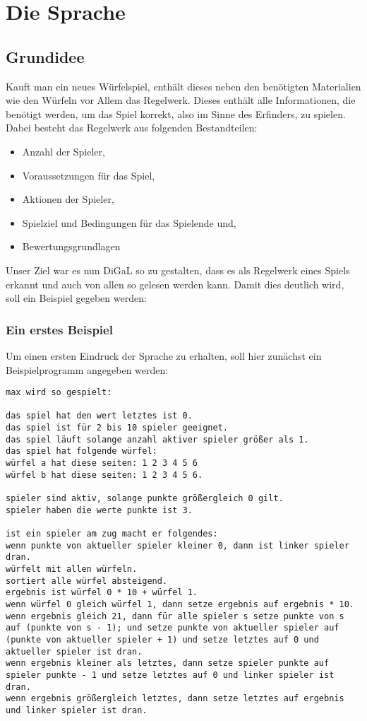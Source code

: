 \documentclass[a4paper, oneside]{book}
\begin{document}
\chapter{Die Sprache} %
\label{cha:die_sprache}
	\section{Grundidee}
	\label{sec:grundidee}
		Kauft man ein neues Würfelspiel, enthält dieses neben den benötigten Materialien wie den Würfeln vor Allem das Regelwerk. Dieses enthält alle Informationen, die benötigt werden, um das Spiel korrekt, also im Sinne des Erfinders, zu spielen. Dabei besteht das Regelwerk aus folgenden Bestandteilen:
		\begin{itemize}
			\item Anzahl der Spieler,
			\item Voraussetzungen für das Spiel,
			\item Aktionen der Spieler,
			\item Spielziel und Bedingungen für das Spielende und,
			\item Bewertungsgrundlagen
		\end{itemize}
		Unser Ziel war es nun DiGaL so zu gestalten, dass es als Regelwerk eines Spiels erkannt und auch von allen so gelesen werden kann. Damit dies deutlich wird, soll ein Beispiel gegeben werden:
		\subsection{Ein erstes Beispiel}
		\label{sub:ein_erstes_beispiel}
			Um einen ersten Eindruck der Sprache zu erhalten, soll hier zunächst ein Beispielprogramm angegeben werden:\\
\begin{lstlisting}
max wird so gespielt:

das spiel hat den wert letztes ist 0.
das spiel ist für 2 bis 10 spieler geeignet.
das spiel läuft solange anzahl aktiver spieler größer als 1.
das spiel hat folgende würfel:
würfel a hat diese seiten: 1 2 3 4 5 6
würfel b hat diese seiten: 1 2 3 4 5 6.

spieler sind aktiv, solange punkte größergleich 0 gilt.
spieler haben die werte punkte ist 3.

ist ein spieler am zug macht er folgendes:
wenn punkte von aktueller spieler kleiner 0, dann ist linker spieler dran.
würfelt mit allen würfeln.
sortiert alle würfel absteigend.
ergebnis ist würfel 0 * 10 + würfel 1.
wenn würfel 0 gleich würfel 1, dann setze ergebnis auf ergebnis * 10.
wenn ergebnis gleich 21, dann für alle spieler s setze punkte von s auf (punkte von s - 1); und setze punkte von aktueller spieler auf (punkte von aktueller spieler + 1) und setze letztes auf 0 und aktueller spieler ist dran.
wenn ergebnis kleiner als letztes, dann setze spieler punkte auf spieler punkte - 1 und setze letztes auf 0 und linker spieler ist dran.
wenn ergebnis größergleich letztes, dann setze letztes auf ergebnis und linker spieler ist dran.

\end{lstlisting}
\end{document}
